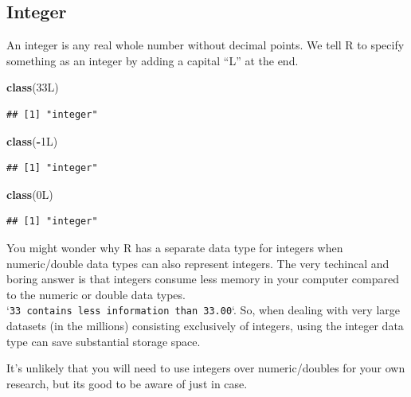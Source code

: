 \documentclass[
]{book}
\newenvironment{Shaded}{\begin{snugshade}}{\end{snugshade}}
\newcommand{\FunctionTok}[1]{\textcolor[rgb]{0.13,0.29,0.53}{\textbf{#1}}}
\newcommand{\NormalTok}[1]{#1}
\newcommand{\SpecialCharTok}[1]{\textcolor[rgb]{0.81,0.36,0.00}{\textbf{#1}}}
\begin{document}
\hypertarget{integer}{%
\subsection{Integer}\label{integer}}

An integer is any real whole number without decimal points. We tell R to specify something as an integer by adding a capital ``L'' at the end.

\begin{Shaded}
\begin{Highlighting}[]
\FunctionTok{class}\NormalTok{(33L)}
\end{Highlighting}
\end{Shaded}

\begin{verbatim}
## [1] "integer"
\end{verbatim}

\begin{Shaded}
\begin{Highlighting}[]
\FunctionTok{class}\NormalTok{(}\SpecialCharTok{{-}}\NormalTok{1L)}
\end{Highlighting}
\end{Shaded}

\begin{verbatim}
## [1] "integer"
\end{verbatim}

\begin{Shaded}
\begin{Highlighting}[]
\FunctionTok{class}\NormalTok{(0L)}
\end{Highlighting}
\end{Shaded}

\begin{verbatim}
## [1] "integer"
\end{verbatim}

You might wonder why R has a separate data type for integers when numeric/double data types can also represent integers. The very techincal and boring answer is that integers consume less memory in your computer compared to the numeric or double data types. `\texttt{33\ contains\ less\ information\ than\ 33.00}`. So, when dealing with very large datasets (in the millions) consisting exclusively of integers, using the integer data type can save substantial storage space.

It's unlikely that you will need to use integers over numeric/doubles for your own research, but its good to be aware of just in case.
\end{document}
